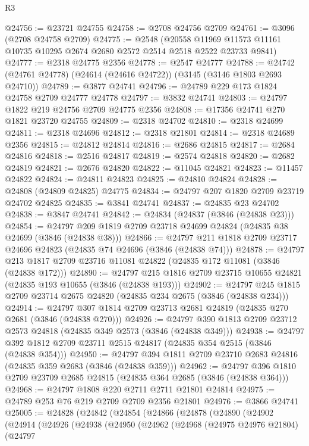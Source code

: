 \begin{lexlean}{R3}
\begin{coremodule}
@24756 := @23721 @24755
@24758 := @2708 @24756 @2709
@24761 := @3096 (@2708 @24758 @2709)
@24775 := @2548
    (@20558 @11969 @11573 @11161 @10735 @10295 @2674 @2680 @2572 @2514 @2518 @2522 @23733 @9841)
@24777 := @2318 @24775 @2356
@24778 := @2547 @24777
@24788 := @24742 (@24761 @24778) (@24614 (@24616 @24722)) (@3145 (@3146 @1803 @2693 @24710))
@24789 := @3877 @24741
@24796 := @24789 @229 @173 @1824 @24758 @2709 @24777 @24778
@24797 := @3832 @24741
@24803 := @24797 @1822 @219 @24756 @2709 @24775 @2356
@24808 := @17356 @24741 @270 @1821 @23720 @24755
@24809 := @2318 @24702
@24810 := @2318 @24699
@24811 := @2318 @24696
@24812 := @2318 @21801
@24814 := @2318 @24689 @2356
@24815 := @24812 @24814
@24816 := @2686 @24815
@24817 := @2684 @24816
@24818 := @2516 @24817
@24819 := @2574 @24818
@24820 := @2682 @24819
@24821 := @2676 @24820
@24822 := @11045 @24821
@24823 := @11457 @24822
@24824 := @24811 @24823
@24825 := @24810 @24824
@24828 := @24808 (@24809 @24825) @24775
@24834 := @24797 @207 @1820 @2709 @23719 @24702 @24825
@24835 := @3841 @24741
@24837 := @24835 @23 @24702
@24838 := @3847 @24741
@24842 := @24834 (@24837 (@3846 (@24838 @23)))
@24854 := @24797 @209 @1819 @2709 @23718 @24699 @24824 (@24835 @38 @24699 (@3846 (@24838 @38)))
@24866 := @24797 @211 @1818 @2709 @23717 @24696 @24823 (@24835 @74 @24696 (@3846 (@24838 @74)))
@24878 := @24797 @213 @1817 @2709 @23716 @11081 @24822 (@24835 @172 @11081 (@3846 (@24838 @172)))
@24890 := @24797 @215 @1816 @2709 @23715 @10655 @24821 (@24835 @193 @10655 (@3846 (@24838 @193)))
@24902 := @24797 @245 @1815 @2709 @23714 @2675 @24820 (@24835 @234 @2675 (@3846 (@24838 @234)))
@24914 := @24797 @307 @1814 @2709 @23713 @2681 @24819 (@24835 @270 @2681 (@3846 (@24838 @270)))
@24926 := @24797 @390 @1813 @2709 @23712 @2573 @24818 (@24835 @349 @2573 (@3846 (@24838 @349)))
@24938 := @24797 @392 @1812 @2709 @23711 @2515 @24817 (@24835 @354 @2515 (@3846 (@24838 @354)))
@24950 := @24797 @394 @1811 @2709 @23710 @2683 @24816 (@24835 @359 @2683 (@3846 (@24838 @359)))
@24962 := @24797 @396 @1810 @2709 @23709 @2685 @24815 (@24835 @364 @2685 (@3846 (@24838 @364)))
@24968 := @24797 @1808 @220 @2711 @2711 @21801 @24814
@24975 := @24789 @253 @76 @219 @2709 @2709 @2356 @21801
@24976 := @3866 @24741
@25005 := @24828
    (@24842
      (@24854
        (@24866
          (@24878
            (@24890
              (@24902
                (@24914
                  (@24926
                    (@24938
                      (@24950
                        (@24962
                          (@24968
                            (@24975 @24976 @21804)
                            (@24797

\end{coremodule}
\end{lexlean}
